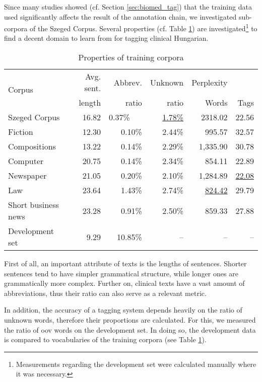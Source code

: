 Since many studies showed (cf. Section \ref{sec:biomed_tag}) that the training data used significantly affects the result of the annotation chain, we investigated sub-corpora of the Szeged Corpus. 
Several properties (cf. Table \ref{tab:subcorpora_attrib}) are  investigated\footnote{Measurements regarding the development set were calculated manually where it was necessary.} to find a decent domain to learn from for tagging clinical Hungarian. 

\begin{table}[H]
\centering
\caption{Properties of training corpora}
\label{tab:subcorpora_attrib}
\begin{tabular}{ l r r r r r } 
\hline
\multicolumn{1}{l}{\multirow{2}{*}{Corpus}} & Avg. sent. & Abbrev.  &  Unknown & Perplexity \\
 & length & ratio &  ratio & Words & Tags \\
\hline
Szeged Corpus & 16.82 & 0.37\%\ \ \  & \underline{1.78\%} & \ \ 2318.02 & 22.56\\
\hspace{0.2cm} Fiction & 12.30 & 0.10\% & 2.44\% & 995.57 & 32.57\\
\hspace{0.2cm} Compositions & 13.22 & 0.14\% & 2.29\% & 1,335.90 & 30.78\\
\hspace{0.2cm} Computer & 20.75 & 0.14\% & 2.34\% & 854.11 & 22.89\\
\hspace{0.2cm} Newspaper & 21.05 & 0.20\% & 2.10\% & 1,284.89 & \underline{22.08}\\
\hspace{0.2cm} Law & 23.64 & 1.43\% & 2.74\% & \underline{824.42} & 29.79\\
\hspace{0.2cm} Short business news & 23.28 & 0.91\% & 2.50\% & 859.33 & 27.88\\
Development set & 9.29 & 10.85\% & -- & -- & -- \\
\hline
\end{tabular}
\end{table}

First of all, an important attribute of texts is the lengths of sentences. 
Shorter sentences tend to have simpler grammatical structure, while longer ones are grammatically more complex. 
Further on, clinical texts have a vast amount of abbreviations, thus their ratio can also serve as a relevant metric. 

In addition, the accuracy of a tagging system depends heavily on the ratio of unknown words, therefore their proportions are calculated. 
For this, we measured the ratio of \acrshort{oov} words on the development set. 
In doing so, the development data is compared to vocabularies of the training corpora (see Table \ref{tab:subcorpora_attrib}). 


